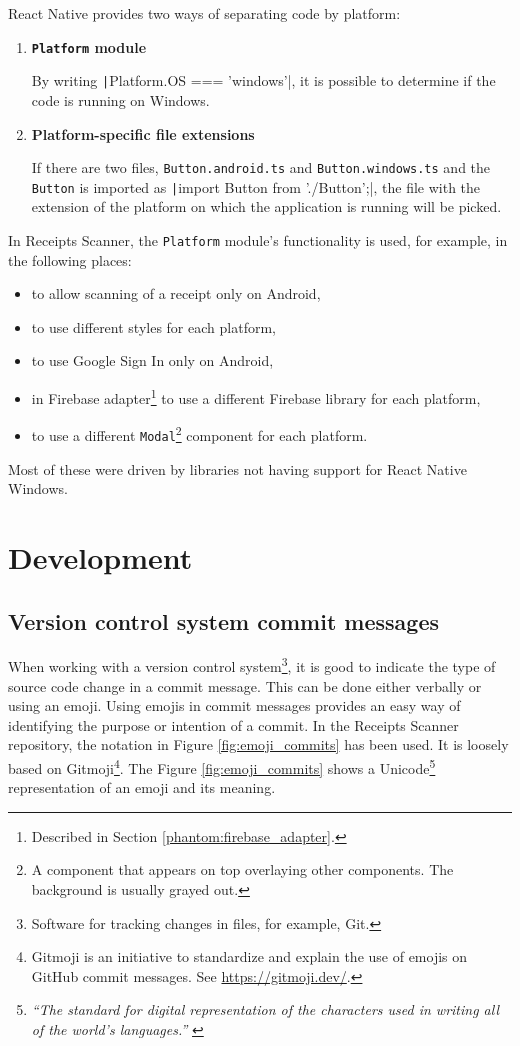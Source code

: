 \documentclass[
  digital, %
  table,   %
  oneside, %
  lof,     %
  lot,     %
]{fithesis3}
\newcommand{\code}[1]{\texttt|#1|} %
\begin{document}
React Native provides two ways of separating code by platform:
\begin{enumerate}
\item \textbf{\texttt{Platform} module}
    
    By writing \code{Platform.OS === 'windows'}, it is possible to determine if the code is running on Windows.
\item \textbf{Platform-specific file extensions}

    If there are two files, \texttt{Button.android.ts} and \texttt{Button.windows.ts} and the \texttt{Button} is imported as \code{import Button from './Button';}‚ the file with the extension of the platform on which the application is running will be picked.
\end{enumerate}

In Receipts Scanner, the \texttt{Platform} module's functionality is used, for example, in the following places:
\begin{itemize}
    \item to allow scanning of a receipt only on Android,
    \item to use different styles for each platform,
    \item to use Google Sign In only on Android,
    \item in Firebase adapter\footnote{Described in Section \ref{phantom:firebase_adapter}.} to use a different Firebase library for each platform,
    \item to use a different \texttt{Modal}\footnote{A component that appears on top overlaying other components. The background is usually grayed out.} component for each platform.
\end{itemize}
Most of these were driven by libraries not having support for React Native Windows.

\chapter{Development}
\section{Version control system commit messages}
When working with a version control system\footnote{Software for tracking changes in files, for example, Git.}, it is good to indicate the type of source code change in a commit message. This can be done either verbally or using an emoji.
Using emojis in commit messages provides an easy way of identifying the purpose or intention of a commit. In the Receipts Scanner repository, the notation in Figure \ref{fig:emoji_commits} has been used. It is loosely based on Gitmoji\footnote{Gitmoji is an initiative to standardize and explain the use of emojis on GitHub commit messages. See \url{https://gitmoji.dev/}.}. The Figure \ref{fig:emoji_commits} shows a Unicode\footnote{\textit{``The standard for digital representation of the characters used in writing all of the world's languages.''} \cite{Unicode}} representation of an emoji and its meaning.
\end{document}
